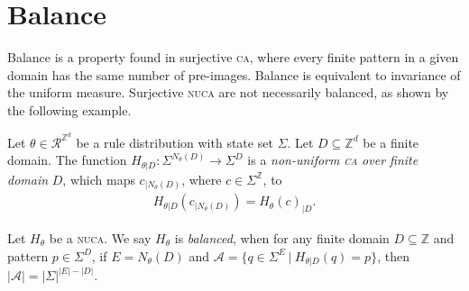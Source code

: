 \documentclass[runningheads]{llncs}
\newcommand{\Z}{\mathbb{Z}}
\newcommand{\R}{\mathcal{R}}
\newcommand{\set}[2]{\{ #1 \: | \: #2 \}}
\begin{document}
\section{Balance}

Balance is a property found in surjective \textsc{ca}, where every finite pattern in a given domain has the same number of pre-images. Balance is equivalent to invariance of the uniform measure. Surjective \textsc{nuca} are not necessarily balanced, as shown by the following example.

\begin{definition}
Let $\theta \in \R^{\Z^d}$ be a rule distribution with state set $\Sigma$. Let $D \subseteq \Z^d$ be a finite domain. The function $H_{\theta |D}: \Sigma^{N_\theta(D)} \rightarrow \Sigma^D$ is a \emph{non-uniform \textsc{ca} over finite domain} $D$, which maps $c_{|N_\theta (D)}$, where $c \in \Sigma^\Z$, to
\begin{align*}
H_{\theta|D} (c_{|N_\theta (D)}) = H_\theta (c)_{|D}.
\end{align*}
\end{definition}

\begin{definition}
Let $H_\theta$ be a \textsc{nuca}. We say $H_\theta$ is \emph{balanced}, when for any finite domain $D\subseteq \Z$ and pattern $p \in \Sigma^D$, if $E = N_\theta(D)$ and $\mathcal{A} = \set{q \in \Sigma^E}{H_{\theta|D}(q) = p}$, then $|\mathcal{A}| = |\Sigma|^{|E|-|D|}$.
\end{definition}

\end{document}
